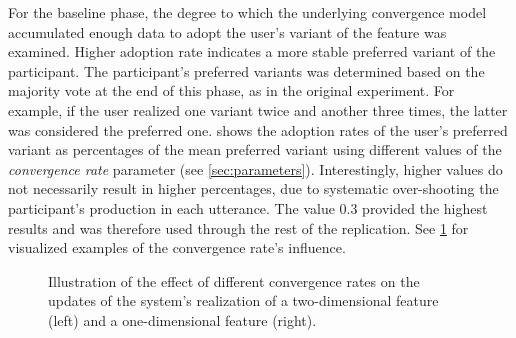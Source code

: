 For the baseline phase, the degree to which the underlying convergence model accumulated enough data to adopt the user's variant of the feature was examined.
Higher adoption rate indicates a more stable preferred variant of the participant.
The participant's preferred variants was determined based on the majority vote at the end of this phase, as in the original experiment.
For example, if the user realized one variant twice and another three times, the latter was considered the preferred one.
 shows the adoption rates of the user's preferred variant as percentages of the mean preferred variant using different values of the \emph{convergence rate} parameter (see \cref{sec:parameters}).
Interestingly, higher values do not necessarily result in higher percentages, due to systematic over-shooting the participant's production in each utterance.
The value 0.3 provided the highest results and was therefore used through the rest of the replication.
See \cref{fig:validation_sensitivity} for visualized examples of the convergence rate's influence.
%
\begin{figure}[t]
	\centering
	\hfill
	\caption[Influence of difference convergence rates on the system's accommodation]
		{Illustration of the effect of different convergence rates on the updates of the system's realization of a two-dimensional feature (left) and a one-dimensional feature (right).}
	\label{fig:validation_sensitivity}
\end{figure}
